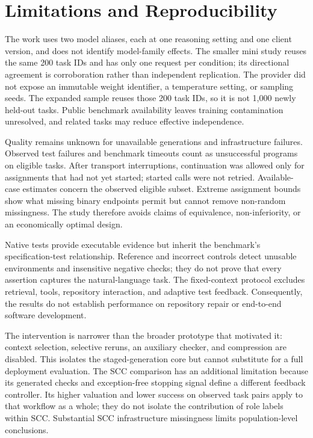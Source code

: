 \section{Limitations and Reproducibility}
The work uses two model aliases, each at one reasoning setting and one client version, and does not identify model-family effects. The smaller mini study reuses the same 200 task IDs and has only one request per condition; its directional agreement is corroboration rather than independent replication. The provider did not expose an immutable weight identifier, a temperature setting, or sampling seeds. The expanded sample reuses those 200 task IDs, so it is not 1,000 newly held-out tasks. Public benchmark availability leaves training contamination unresolved, and related tasks may reduce effective independence.

Quality remains unknown for unavailable generations and infrastructure failures. Observed test failures and benchmark timeouts count as unsuccessful programs on eligible tasks. After transport interruptions, continuation was allowed only for assignments that had not yet started; started calls were not retried. Available-case estimates concern the observed eligible subset. Extreme assignment bounds show what missing binary endpoints permit but cannot remove non-random missingness. The study therefore avoids claims of equivalence, non-inferiority, or an economically optimal design.

Native tests provide executable evidence but inherit the benchmark's specification-test relationship. Reference and incorrect controls detect unusable environments and insensitive negative checks; they do not prove that every assertion captures the natural-language task. The fixed-context protocol excludes retrieval, tools, repository interaction, and adaptive test feedback. Consequently, the results do not establish performance on repository repair or end-to-end software development.

The intervention is narrower than the broader prototype that motivated it: context selection, selective reruns, an auxiliary checker, and compression are disabled. This isolates the staged-generation core but cannot substitute for a full deployment evaluation. The SCC comparison has an additional limitation because its generated checks and exception-free stopping signal define a different feedback controller. Its higher valuation and lower success on observed task pairs apply to that workflow as a whole; they do not isolate the contribution of role labels within SCC. Substantial SCC infrastructure missingness limits population-level conclusions.

